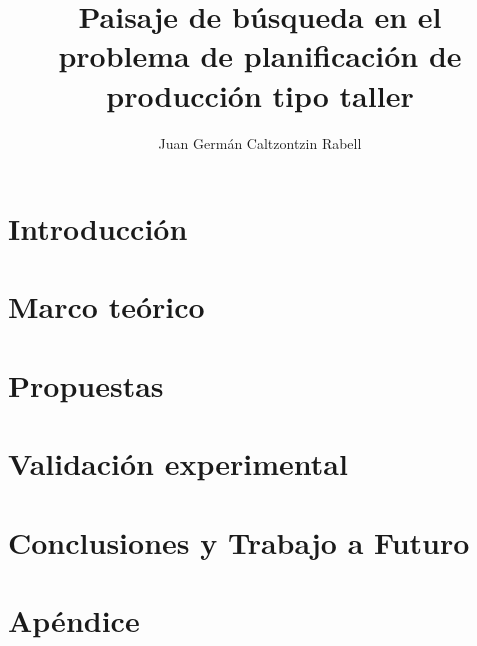 \documentclass[12pt,letterpaper]{book}
\author{Juan Germán Caltzontzin Rabell}
\title{Paisaje de búsqueda en el problema de planificación de producción tipo taller}
\begin{document}

\pagebreak \frontmatter
{}
 \newpage
%
 \newpage
\dominitoc \tableofcontents \let\cleardoublepage\clearpage

\mainmatter

\chapter{Introducción}\label{cap:introduccion}  \minitoc








%
\newpage

\chapter{Marco teórico}\label{cap:marcot} \minitoc




\newpage

\chapter{Propuestas}\label{cap:prop}






\chapter{Validación experimental}




\newpage
\chapter{Conclusiones y Trabajo a Futuro}\label{cap:ct} \minitoc

\appendix
\chapter{Apéndice}
\label{app:sotares} \newpage
\label{app:resn7ils} \newpage
\label{app:resn7tuple} \newpage
\label{app:resn8tuple} \newpage
\label{app:resprtuple} \newpage



\end{document}
